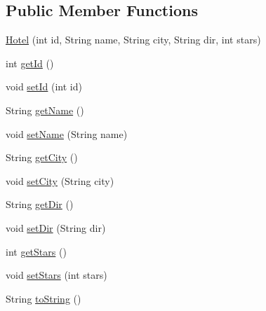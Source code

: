 \subsection*{Public Member Functions}
\begin{DoxyCompactItemize}
\item 
\mbox{\hyperlink{classbspq18__e4_1_1_gestion_hotelera_1_1server_1_1data_1_1_hotel_a74ad05c5f38a7ce193133753dd1a5fac}{Hotel}} (int id, String name, String city, String dir, int stars)
\item 
int \mbox{\hyperlink{classbspq18__e4_1_1_gestion_hotelera_1_1server_1_1data_1_1_hotel_a2937732c5122645cd094d1f875a71a79}{get\+Id}} ()
\item 
void \mbox{\hyperlink{classbspq18__e4_1_1_gestion_hotelera_1_1server_1_1data_1_1_hotel_a76d2361692a2491085a6091de04587e4}{set\+Id}} (int id)
\item 
String \mbox{\hyperlink{classbspq18__e4_1_1_gestion_hotelera_1_1server_1_1data_1_1_hotel_a9274ac82ac3d0dfba5052778cb491913}{get\+Name}} ()
\item 
void \mbox{\hyperlink{classbspq18__e4_1_1_gestion_hotelera_1_1server_1_1data_1_1_hotel_a0d6589791a9a0609b4b093d79d7418cf}{set\+Name}} (String name)
\item 
String \mbox{\hyperlink{classbspq18__e4_1_1_gestion_hotelera_1_1server_1_1data_1_1_hotel_a1d38937c79ac792d785142da287dbc4e}{get\+City}} ()
\item 
void \mbox{\hyperlink{classbspq18__e4_1_1_gestion_hotelera_1_1server_1_1data_1_1_hotel_adf31486f6c09c05eaf38427cb2fcc12d}{set\+City}} (String city)
\item 
String \mbox{\hyperlink{classbspq18__e4_1_1_gestion_hotelera_1_1server_1_1data_1_1_hotel_a6e8d3f5c2fc4ec1810807dce75e16f1c}{get\+Dir}} ()
\item 
void \mbox{\hyperlink{classbspq18__e4_1_1_gestion_hotelera_1_1server_1_1data_1_1_hotel_abf467189d148dd2bee3f41b0bf463b52}{set\+Dir}} (String dir)
\item 
int \mbox{\hyperlink{classbspq18__e4_1_1_gestion_hotelera_1_1server_1_1data_1_1_hotel_abc1c8e96f6121916925f009f1ac1e3fb}{get\+Stars}} ()
\item 
void \mbox{\hyperlink{classbspq18__e4_1_1_gestion_hotelera_1_1server_1_1data_1_1_hotel_ac2daf2bfe418ee3bc15ae340c97a05ee}{set\+Stars}} (int stars)
\item 
String \mbox{\hyperlink{classbspq18__e4_1_1_gestion_hotelera_1_1server_1_1data_1_1_hotel_a9b345b158f49b2d0a5676eb9cab0a721}{to\+String}} ()
\end{DoxyCompactItemize}


